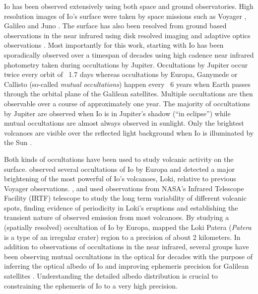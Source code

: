 \documentclass[modern]{aastex62}
\begin{document}
Io has been observed extensively using both space and ground observatories.
High resolution images of Io's surface were taken by space missions such as Voyager \citep{smith1979}, Galileo \citep{belton1996} and Juno \citep{mura2020}.
The surface has also been resolved from ground based observations in the near infrared using disk resolved imaging \citep{howell1985,simonelli1986,spencer1990} and adaptive optics observations \citep{marchis2000,marchis2005,dekleer2016}.
Most importantly for this work,  starting with \cite{spencer1990} Io has been sporadically observed over a timespan of decades using high cadence near infrared photometry taken during occultations by Jupiter.
Occultations by Jupiter occur twice every orbit of ~1.7 days whereas occultations by Europa, Ganymede or Callisto (so-called \emph{mutual occultations}) happen every ~6 years when Earth passes through the orbital plane of the Galilean satellites.
Multiple occultations are then observable over a course of approximately one year.
The majority of occultations by Jupiter are observed when Io is in Jupiter's shadow (``in eclipse'') while mutual occultations are almost always observed in sunlight.
Only the brightest volcanoes are visible over the reflected light background when Io is illuminated by the Sun \citep{veeder1994,dekleer2016a}.

Both kinds of occultations have been used to study volcanic activity on the surface.
\cite{spencer1994} observed several occultations of Io by Europa and detected a major brightening of the most powerful of Io's volcanoes, Loki, relative to previous Voyager observations.
\cite{rathbun2002},\citet{rathbun2006} and \citet{rathbun2010} used observations from NASA's 
Infrared Telescope Facility (IRTF) telescope to study the long term variability of different volcanic spots, finding evidence of periodicity in Loki's eruptions and establishing the transient nature of observed emission from most volcanoes. 
By studying a (spatially resolved) occultation of Io by Europa, \cite{dekleer2017} mapped the Loki Patera (\emph{Patera} is a type of an irregular crater) region to a precision of about 2 kilometers.
In addition to observations of occultations in the near infrared, several groups have been observing mutual occultations in the optical for decades with the purpose of inferring the optical albedo of Io and improving ephemeris precision for Galilean satellites \citep[][and references therein]{arlot1974,saquet2018,morgado2016a}.
Understanding the detailed albedo distribution is crucial to constraining the ephemeris of Io to a very high precision.
\end{document}
